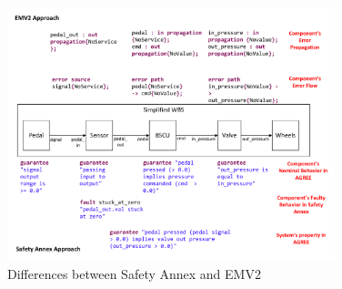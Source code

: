 \begin{figure}[h!]
	\vspace{-0.19in}
	\centering
	\includegraphics[trim=0 9 0 5,clip,width=0.85\textwidth]{images/Visio-Comparison_with_EMV2.pdf}
	\caption{Differences between Safety Annex and EMV2}
	\label{fig:comparison_with_EMV2}
\end{figure}

 


